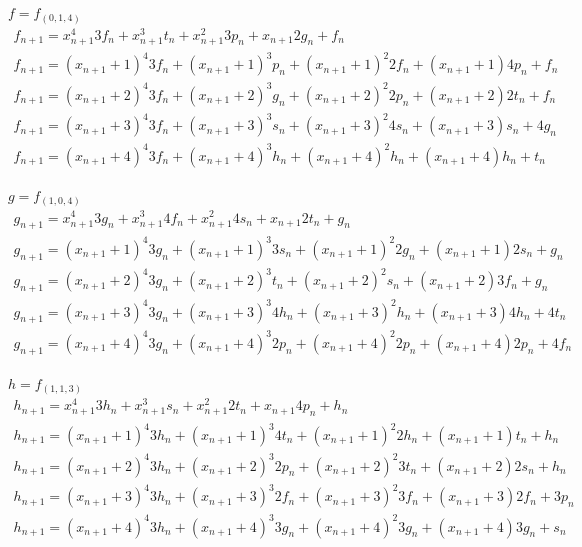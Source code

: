 \documentclass[a4paper, 14pt]{extarticle}
\begin{document}
$f=f_{(0,1,4)}$
$$
\begin{array}{l}
f_{n+1} = x_{n+1}^{4}3f_{n} + x_{n+1}^{3}t_{n} + x_{n+1}^{2}3p_{n} + x_{n+1}2g_{n} + f_{n} \\
f_{n+1} = (x_{n+1}+1)^{4}3f_{n} + (x_{n+1}+1)^{3}p_{n} + (x_{n+1}+1)^{2}2f_{n} + (x_{n+1}+1)4p_{n} + f_{n} \\
f_{n+1} = (x_{n+1}+2)^{4}3f_{n} + (x_{n+1}+2)^{3}g_{n} + (x_{n+1}+2)^{2}2p_{n} + (x_{n+1}+2)2t_{n} + f_{n} \\
f_{n+1} = (x_{n+1}+3)^{4}3f_{n} + (x_{n+1}+3)^{3}s_{n} + (x_{n+1}+3)^{2}4s_{n} + (x_{n+1}+3)s_{n} + 4g_{n} \\
f_{n+1} = (x_{n+1}+4)^{4}3f_{n} + (x_{n+1}+4)^{3}h_{n} + (x_{n+1}+4)^{2}h_{n} + (x_{n+1}+4)h_{n} + t_{n} \\
\end{array}
$$

$g=f_{(1,0,4)}$
$$
\begin{array}{l}
g_{n+1} = x_{n+1}^{4}3g_{n} + x_{n+1}^{3}4f_{n} + x_{n+1}^{2}4s_{n} + x_{n+1}2t_{n} + g_{n} \\
g_{n+1} = (x_{n+1}+1)^{4}3g_{n} + (x_{n+1}+1)^{3}3s_{n} + (x_{n+1}+1)^{2}2g_{n} + (x_{n+1}+1)2s_{n} + g_{n} \\
g_{n+1} = (x_{n+1}+2)^{4}3g_{n} + (x_{n+1}+2)^{3}t_{n} + (x_{n+1}+2)^{2}s_{n} + (x_{n+1}+2)3f_{n} + g_{n} \\
g_{n+1} = (x_{n+1}+3)^{4}3g_{n} + (x_{n+1}+3)^{3}4h_{n} + (x_{n+1}+3)^{2}h_{n} + (x_{n+1}+3)4h_{n} + 4t_{n} \\
g_{n+1} = (x_{n+1}+4)^{4}3g_{n} + (x_{n+1}+4)^{3}2p_{n} + (x_{n+1}+4)^{2}2p_{n} + (x_{n+1}+4)2p_{n} + 4f_{n} \\
\end{array}
$$

$h=f_{(1,1,3)}$
$$
\begin{array}{l}
h_{n+1} = x_{n+1}^{4}3h_{n} + x_{n+1}^{3}s_{n} + x_{n+1}^{2}2t_{n} + x_{n+1}4p_{n} + h_{n} \\
h_{n+1} = (x_{n+1}+1)^{4}3h_{n} + (x_{n+1}+1)^{3}4t_{n} + (x_{n+1}+1)^{2}2h_{n} + (x_{n+1}+1)t_{n} + h_{n} \\
h_{n+1} = (x_{n+1}+2)^{4}3h_{n} + (x_{n+1}+2)^{3}2p_{n} + (x_{n+1}+2)^{2}3t_{n} + (x_{n+1}+2)2s_{n} + h_{n} \\
h_{n+1} = (x_{n+1}+3)^{4}3h_{n} + (x_{n+1}+3)^{3}2f_{n} + (x_{n+1}+3)^{2}3f_{n} + (x_{n+1}+3)2f_{n} + 3p_{n} \\
h_{n+1} = (x_{n+1}+4)^{4}3h_{n} + (x_{n+1}+4)^{3}3g_{n} + (x_{n+1}+4)^{2}3g_{n} + (x_{n+1}+4)3g_{n} + s_{n} \\
\end{array}
$$
\end{document}
